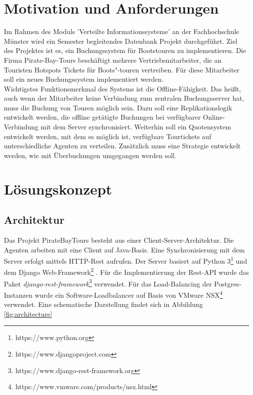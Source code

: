 \documentclass[12pt,a4paper,ngerman,english]{report}
\begin{document}
\chapter{Motivation und Anforderungen}
Im Rahmen des Moduls 'Verteilte Informationssysteme' an der Fachhochschule Münster wird ein Semester begleitendes Datenbank Projekt durchgeführt. Ziel des Projektes ist es, ein Buchungssystem für Bootstouren zu implementieren. Die Firma Pirate-Bay-Tours beschäftigt mehrere Vertriebsmitarbeiter, die an Touristen Hotspots Tickets für Boots"-touren vertreiben. Für diese Mitarbeiter soll ein neues Buchungssystem implementiert werden.\\
Wichtigstes Funktionsmerkmal des Systems ist die Offline-Fähigkeit. Das heißt, auch wenn der Mitarbeiter keine Verbindung zum zentralen Buchungsserver hat, muss die Buchung von Touren möglich sein. Dazu soll eine Replikationslogik entwickelt werden, die offline getätigte Buchungen bei verfügbarer Online-Verbindung mit dem Server synchronisiert. Weiterhin soll ein Quotensystem entwickelt werden, mit dem es möglich ist, verfügbare Tourtickets auf unterschiedliche Agenten zu verteilen. Zusätzlich muss eine Strategie entwickelt werden, wie mit Überbuchungen umgegangen werden soll.

\chapter{Lösungskonzept}
\section{Architektur}

Das Projekt PirateBayTours besteht aus einer Client-Server-Architektur.
Die Agenten arbeiten mit eine Client auf Java-Basis. Eine Synchronisierung mit dem Server erfolgt mittels HTTP-Rest aufrufen. Der Server basiert auf Python 3\footnote{https://www.python.org} und dem Django Web-Framework\footnote{https://www.djangoproject.com} . Für die Implementierung der Rest-API wurde das Paket \textit{django-rest-framework}\footnote{https://www.django-rest-framework.org} verwendet. Für das Load-Balancing der Postgres-Instanzen wurde ein Software-Loadbalancer auf Basis von VMware NSX\footnote{https://www.vmware.com/products/nsx.html} verwendet. Eine schematische Darstellung findet sich in Abbildung \ref{fig:architecture}
\end{document}
